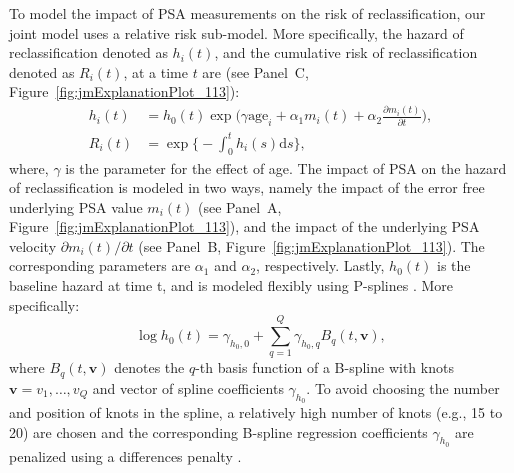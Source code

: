 To model the impact of PSA measurements on the risk of reclassification, our joint model uses a relative risk sub-model. More specifically, the hazard of reclassification denoted as $h_i(t)$, and the cumulative risk of reclassification denoted as $R_i(t)$, at a time $t$ are (see Panel~C, Figure~\ref{fig:jmExplanationPlot_113}):
\begin{equation}
\label{eq:rel_risk_model}
\begin{split}
    h_i(t) &= h_0(t) \exp\Big(\gamma \mbox{age}_i +\alpha_{1} m_{i}(t) + \alpha_{2} \frac{\partial m_{i}(t)}{\partial {t}}\Big),\\
    R_i(t) &= \exp\Big\{-\int_0^{t} h_i(s)\mathrm{d}{s}\Big\},
    \end{split}
\end{equation}
where, $\gamma$ is the parameter for the effect of age. The impact of PSA on the hazard of reclassification is modeled in two ways, namely the impact of the error free underlying PSA value $m_{i}(t)$ (see Panel~A, Figure~\ref{fig:jmExplanationPlot_113}), and the impact of the underlying PSA velocity $\partial m_{i}(t)/\partial {t}$ (see Panel~B, Figure~\ref{fig:jmExplanationPlot_113}). The corresponding parameters are $\alpha_{1}$ and $\alpha_{2}$, respectively. Lastly, $h_0(t)$ is the baseline hazard at time t, and is modeled flexibly using P-splines \citep{eilers1996flexible}. More specifically:
\begin{equation*}
\log{h_0(t)} = \gamma_{h_0,0} + \sum_{q=1}^Q \gamma_{h_0,q} B_q(t, \boldsymbol{v}),
\end{equation*}
where $B_q(t, \boldsymbol{v})$ denotes the $q$-th basis function of a B-spline with knots $\boldsymbol{v} = v_1, \ldots, v_Q$ and vector of spline coefficients $\gamma_{h_0}$. To avoid choosing the number and position of knots in the spline, a relatively high number of knots (e.g., 15 to 20) are chosen and the corresponding B-spline regression coefficients $\gamma_{h_0}$ are penalized using a differences penalty \citep{eilers1996flexible}.


